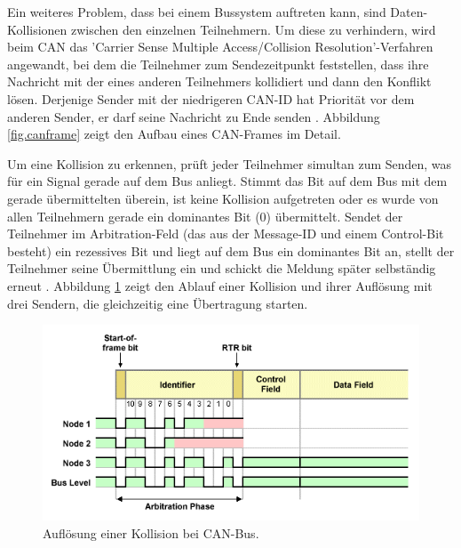 Ein weiteres Problem, dass bei einem Bussystem auftreten kann, sind Daten-Kollisionen zwischen den einzelnen Teilnehmern. Um diese zu verhindern, wird beim CAN das 'Carrier Sense Multiple Access/Collision Resolution'-Verfahren angewandt, bei dem die Teilnehmer zum Sendezeitpunkt feststellen, dass ihre Nachricht mit der eines anderen Teilnehmers kollidiert und dann den Konflikt lösen. Derjenige Sender mit der niedrigeren CAN-ID hat Priorität vor dem anderen Sender, er darf seine Nachricht zu Ende senden \cite{boschcanspec2}. Abbildung \ref{fig.canframe} zeigt den Aufbau eines CAN-Frames im Detail.

Um eine Kollision zu erkennen, prüft jeder Teilnehmer simultan zum Senden, was für ein Signal gerade auf dem Bus anliegt. Stimmt das Bit auf dem Bus mit dem gerade übermittelten überein, ist keine Kollision aufgetreten oder es wurde von allen Teilnehmern gerade ein dominantes Bit (0) übermittelt. Sendet der Teilnehmer im Arbitration-Feld (das aus der Message-ID und einem Control-Bit besteht) ein rezessives Bit und liegt auf dem Bus ein dominantes Bit an, stellt der Teilnehmer seine Übermittlung ein und schickt die Meldung später selbständig erneut \cite{boschcanspec2}. Abbildung \ref{fig.canarbitration} zeigt den Ablauf einer Kollision und ihrer Auflösung mit drei Sendern, die gleichzeitig eine Übertragung starten. 

\begin{figure}
	\centering
		\includegraphics[height=0.9\textheight]{images/canarbitration.png}
	\caption{Auflösung einer Kollision bei CAN-Bus.}
	\label{fig.canarbitration}
\end{figure}


